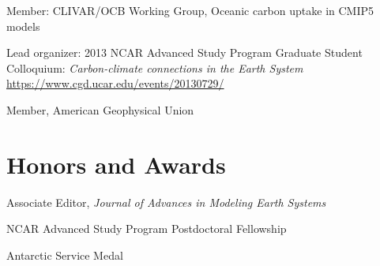 \documentclass[11pt]{article}
\begin{document}
\begin{description}[style=multiline,leftmargin=2.5cm,font=\normalfont]
\item [2012-2015] Member: CLIVAR/OCB Working Group, Oceanic carbon uptake in CMIP5 models

\item[2013]	Lead organizer: 2013 NCAR Advanced Study Program
			Graduate Student Colloquium:
			\textit{Carbon-climate connections in the Earth System} \\
			\url{https://www.cgd.ucar.edu/events/20130729/}

\item[2004--present] Member, American Geophysical Union
\end{description}


\section{Honors and Awards}

\begin{description}[style=multiline,leftmargin=2.5cm,font=\normalfont]
\item[2022--] Associate Editor, \textit{Journal of Advances in Modeling Earth Systems}
\item[2010--2012] NCAR Advanced Study Program Postdoctoral Fellowship
\item[2006] Antarctic Service Medal
\end{description}
\end{document}
